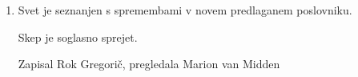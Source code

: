 \documentclass[12pt]{article}
\theoremstyle{definition}
\begin{document}
\begin{enumerate}[label =\textbf{Ad. \arabic*.}]
\addtocounter{enumi}{4}
\item Svet je seznanjen s spremembami v novem predlaganem poslovniku.


Skep je soglasno sprejet.\\

\setlength{\parskip}{9pt}

\noindent Zapisal Rok Gregori\v{c}, pregledala Marion van Midden\\

\end{enumerate}
\end{document}
